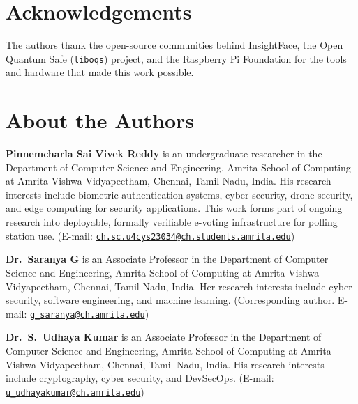 \documentclass[a4paper,12pt]{article}
\begin{document}
\section*{Acknowledgements}

The authors thank the open-source communities behind InsightFace, the
Open Quantum Safe (\texttt{liboqs}) project, and the Raspberry Pi
Foundation for the tools and hardware that made this work possible.


\section*{About the Authors}

\textbf{Pinnemcharla Sai Vivek Reddy} is an undergraduate researcher in
the Department of Computer Science and Engineering, Amrita School of
Computing at Amrita Vishwa Vidyapeetham, Chennai, Tamil Nadu, India.
His research interests include biometric authentication systems,
cyber security, drone security, and edge computing for security
applications. This work forms part of ongoing research into deployable,
formally verifiable e-voting infrastructure for polling station use.
(E-mail: \href{mailto:ch.sc.u4cys23034@ch.students.amrita.edu}{\nolinkurl{ch.sc.u4cys23034@ch.students.amrita.edu}})

\bigskip

\textbf{Dr.\ Saranya G} is an Associate Professor in the Department of
Computer Science and Engineering, Amrita School of Computing at Amrita
Vishwa Vidyapeetham, Chennai, Tamil Nadu, India. Her research interests
include cyber security, software engineering, and machine learning.
(Corresponding author. E-mail: \href{mailto:g_saranya@ch.amrita.edu}{\nolinkurl{g_saranya@ch.amrita.edu}})

\bigskip

\textbf{Dr.\ S.\ Udhaya Kumar} is an Associate Professor in the
Department of Computer Science and Engineering, Amrita School of
Computing at Amrita Vishwa Vidyapeetham, Chennai, Tamil Nadu, India.
His research interests include cryptography, cyber security, and
DevSecOps.
(E-mail: \href{mailto:u_udhayakumar@ch.amrita.edu}{\nolinkurl{u_udhayakumar@ch.amrita.edu}})
\end{document}
